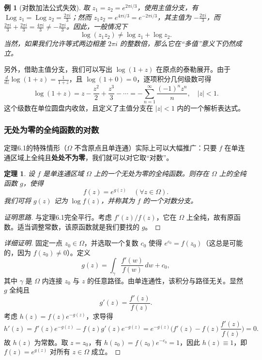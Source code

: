 \documentclass[UTF8]{ctexart}
\newtheorem{theorem}{定理}[section]
\newtheorem{example}{例}[section]
\numberwithin{equation}{section}
\begin{document}
\begin{example}[对数加法公式失效]
取 $z_1=z_2=e^{2\pi i/3}$，使用主值分支，有 $\operatorname{Log} z_1 = \operatorname{Log} z_2 = \frac{2\pi i}{3}$；然而 $z_1z_2 = e^{4\pi i/3} = e^{-2\pi i/3}$，其主值为 $-\frac{2\pi i}{3}$，而 $\frac{2\pi i}{3}+\frac{2\pi i}{3} = \frac{4\pi i}{3} \neq -\frac{2\pi i}{3}$。因此，一般情况下
\[
\log(z_1z_2) \neq \log z_1 + \log z_2 .
\]
当然，如果我们允许等式两边相差 $2\pi i$ 的整数倍，那么它在“多值”意义下仍然成立。
\end{example}

另外，借助主值分支，我们可以写出 $\log(1+z)$ 在原点的泰勒展开。由于 $\frac{d}{dz}\log(1+z)=\frac{1}{1+z}$，且 $\log(1+0)=0$，逐项积分几何级数可得
\[
\log(1+z) = z - \frac{z^2}{2} + \frac{z^3}{3} - \cdots = -\sum_{n=1}^\infty \frac{(-1)^n z^n}{n},\quad |z|<1 .
\]
这个级数在单位圆盘内收敛，且定义了主值分支在 $|z|<1$ 内的一个解析表达式。

\subsubsection{无处为零的全纯函数的对数}

定理6.1的特殊情形（$\Omega$ 不含原点且单连通）实际上可以大幅推广：只要 $f$ 在单连通区域上全纯且\textbf{处处不为零}，我们就可以对它取“对数”。

\begin{theorem}
设 $f$ 是单连通区域 $\Omega$ 上的一个无处为零的全纯函数。则存在 $\Omega$ 上的全纯函数 $g$，使得
\[
f(z) = e^{g(z)}\quad (\forall z\in\Omega).
\]
我们可将 $g(z)$ 记为 $\log f(z)$，并称其为 $f$ 的一个对数分支。
\end{theorem}

\begin{proof}[证明思路]
与定理6.1完全平行。考虑 $f'(z)/f(z)$，它在 $\Omega$ 上全纯，故有原函数。适当调整常数，该原函数就是我们要找的 $g$。
\end{proof}

\begin{proof}[详细证明]
固定一点 $z_0\in\Omega$，并选取一个复数 $c_0$ 使得 $e^{c_0}=f(z_0)$（这总是可能的，因为 $f(z_0)\neq0$）。定义
\[
g(z) = \int_{\gamma} \frac{f'(w)}{f(w)}\,dw + c_0 ,
\]
其中 $\gamma$ 是 $\Omega$ 内连接 $z_0$ 与 $z$ 的任意路径。由单连通性，该积分与路径无关。显然 $g$ 全纯且
\[
g'(z) = \frac{f'(z)}{f(z)} .
\]
考虑 $h(z)=f(z)e^{-g(z)}$，求导得
\[
h'(z) = f'(z)e^{-g(z)} - f(z)g'(z)e^{-g(z)} = e^{-g(z)}\bigl(f'(z)-f(z)\frac{f'(z)}{f(z)}\bigr)=0 .
\]
故 $h(z)$ 为常数。取 $z=z_0$，有 $h(z_0)=f(z_0)e^{-c_0}=1$，因此 $h(z)\equiv1$，即 $f(z)=e^{g(z)}$ 对所有 $z\in\Omega$ 成立。
\end{proof}
\end{document}
